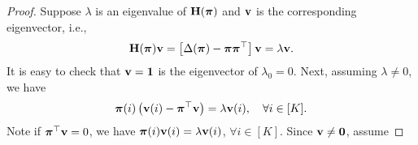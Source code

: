 \documentclass[10pt]{article}
\begin{document}
\begin{proof}
Suppose $\lambda$ is an eigenvalue of ${\mathbf{H}}({\boldsymbol{\pi}})$ and ${\mathbf{v}}$ is the corresponding eigenvector, i.e.,
\begin{equation*}
    {\mathbf{H}}({\boldsymbol{\pi}}) {\mathbf{v}} = \left[ \Delta({\boldsymbol{\pi}}) - {\boldsymbol{\pi}}{\boldsymbol{\pi}}^\top \right] {\mathbf{v}} = \lambda {\mathbf{v}}.
\end{equation*}
It is easy to check that ${\mathbf{v}} = {\mathbf{1}}$ is the eigenvector of $\lambda_0 = 0$. Next, assuming $\lambda \not= 0$, we have
\begin{equation*}
    {\boldsymbol{\pi}}(i) \left( {\mathbf{v}}(i) - {\boldsymbol{\pi}}^\top {\mathbf{v}} \right) = \lambda {\mathbf{v}}(i), \quad \forall i \in [K].
\end{equation*}
Note if ${\boldsymbol{\pi}}^\top {\mathbf{v}} = 0$, we have ${\boldsymbol{\pi}}(i) {\mathbf{v}}(i) = \lambda {\mathbf{v}}(i)$, $\forall i \in [K]$. Since ${\mathbf{v}} \not= {\mathbf{0}}$, assume 
\end{proof}

\fi
\end{document}
